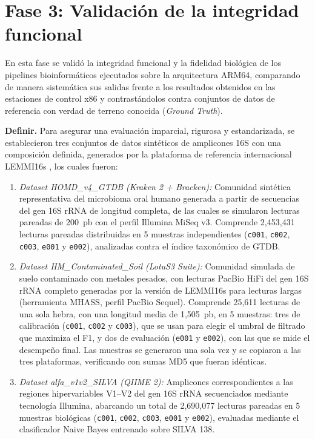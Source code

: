\documentclass[12pt,oneside,spanish]{book}
\begin{document}
    \section{Fase 3: Validación de la integridad funcional}
    \label{sec:fase3_metodologia}
    
    En esta fase se validó la integridad funcional y la fidelidad biológica de los pipelines bioinformáticos ejecutados sobre la arquitectura ARM64, comparando de manera sistemática sus salidas frente a los resultados obtenidos en las estaciones de control x86 y contrastándolos contra conjuntos de datos de referencia con verdad de terreno conocida (\textit{Ground Truth}).
    
    \textbf{Definir.} Para asegurar una evaluación imparcial, rigurosa y estandarizada, se establecieron tres conjuntos de datos sintéticos de amplicones 16S con una composición definida, generados por la plataforma de referencia internacional LEMMI16s \citep{seppey2025lemmi}, los cuales fueron:
    
    \begin{enumerate}
        \item \textit{Dataset HOMD\_v4\_GTDB (Kraken 2 + Bracken):} Comunidad sintética representativa del microbioma oral humano generada a partir de secuencias del gen 16S rRNA de longitud completa, de las cuales se simularon lecturas pareadas de 200~pb con el perfil Illumina MiSeq v3. Comprende 2,453,431 lecturas pareadas distribuidas en 5 muestras independientes (\texttt{c001}, \texttt{c002}, \texttt{c003}, \texttt{e001} y \texttt{e002}), analizadas contra el índice taxonómico de GTDB.
    
        \item \textit{Dataset HM\_Contaminated\_Soil (LotuS3 Suite):} Comunidad simulada de suelo contaminado con metales pesados, con lecturas PacBio HiFi del gen 16S rRNA completo generadas por la versión de LEMMI16s para lecturas largas (herramienta MHASS, perfil PacBio Sequel). Comprende 25,611 lecturas de una sola hebra, con una longitud media de 1,505~pb, en 5 muestras: tres de calibración (\texttt{c001}, \texttt{c002} y \texttt{c003}), que se usan para elegir el umbral de filtrado que maximiza el F1, y dos de evaluación (\texttt{e001} y \texttt{e002}), con las que se mide el desempeño final. Las muestras se generaron una sola vez y se copiaron a las tres plataformas, verificando con sumas MD5 que fueran idénticas.
        
        \item \textit{Dataset alfa\_v1v2\_SILVA (QIIME 2):} Amplicones correspondientes a las regiones hipervariables V1--V2 del gen 16S rRNA secuenciados mediante tecnología Illumina, abarcando un total de 2,690,077 lecturas pareadas en 5 muestras biológicas (\texttt{c001}, \texttt{c002}, \texttt{c003}, \texttt{e001} y \texttt{e002}), evaluadas mediante el clasificador Naive Bayes entrenado sobre SILVA 138.  
    \end{enumerate}
    
\end{document}
